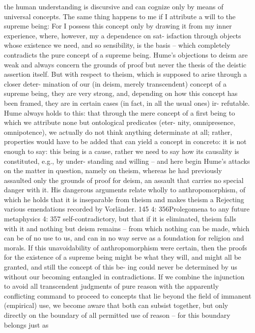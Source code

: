 the human understanding is discursive and can cognize only by means
of universal concepts. The same thing happens to me if I attribute a
will to the supreme being: For I possess this concept only by drawing
it from my inner experience, where, however, my a dependence on sat-
isfaction through objects whose existence we need, and so sensibility, is
the basis – which completely contradicts the pure concept of a supreme
being.
Hume’s objections to deism are weak and always concern the grounds
of proof but never the thesis of the deistic assertion itself. But with
respect to theism, which is supposed to arise through a closer deter-
mination of our (in deism, merely transcendent) concept of a supreme
being, they are very strong, and, depending on how this concept has
been framed, they are in certain cases (in fact, in all the usual ones) ir-
refutable. Hume always holds to this: that through the mere concept of
a ﬁrst being to which we attribute none but ontological predicates (eter-
nity, omnipresence, omnipotence), we actually do not think anything
determinate at all; rather, properties would have to be added that can
yield a concept in concreto: it is not enough to say: this being is a cause,
rather we need to say how its causality is constituted, e.g., by under-
standing and willing – and here begin Hume’s attacks on the matter in
question, namely on theism, whereas he had previously assaulted only
the grounds of proof for deism, an assault that carries no special danger
with it. His dangerous arguments relate wholly to anthropomorphism,
of which he holds that it is inseparable from theism and makes theism
a
Rejecting various emendations recorded by Vorländer.
145
4: 356Prolegomena to any future metaphysics
4: 357
self-contradictory, but that if it is eliminated, theism falls with it and
nothing but deism remains – from which nothing can be made, which
can be of no use to us, and can in no way serve as a foundation for
religion and morals. If this unavoidability of anthropomorphism were
certain, then the proofs for the existence of a supreme being might be
what they will, and might all be granted, and still the concept of this be-
ing could never be determined by us without our becoming entangled in
contradictions.
If we combine the injunction to avoid all transcendent judgments
of pure reason with the apparently conﬂicting command to proceed
to concepts that lie beyond the ﬁeld of immanent (empirical) use, we
become aware that both can subsist together, but only directly on the
boundary of all permitted use of reason – for this boundary belongs just as
